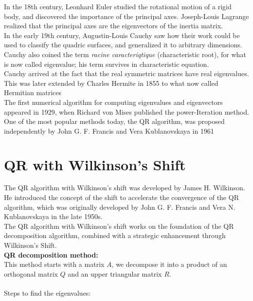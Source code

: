 \documentclass[journal]{IEEEtran}
\begin{document}
In the 18th century, Leonhard Euler studied the rotational motion of a rigid body, and discovered the importance of the principal axes. Joseph-Louis Lagrange realized that the principal axes are the eigenvectors of the inertia matrix. \\

In the early 19th century, Augustin-Louis Cauchy saw how their work could be used to classify the quadric surfaces, and generalized it to arbitrary dimensions. Cauchy also coined the term \textit{racine caracteriqtique} (characteristic root), for what is now called eigenvalue; his term survives in characteristic equation. \\

Cauchy arrived at the fact that the real symmetric matrices have real eigenvalues. This was later extended by Charles Hermite in 1855 to what now called Hermitian matrices \\

The first numerical algorithm for computing eigenvalues and eigenvectors appeared in 1929, when Richard von Mises published the power-Iteration method. One of the most popular methods today, the QR algorithm, was proposed independently by John G. F. Francis and Vera Kublanovskaya in 1961

\section{QR with Wilkinson's Shift}
The QR algorithm with Wilkinson's shift was developed by James H. Wilkinson. He introduced the concept of the shift to accelerate the convergence of the QR algorithm, which was originally developed by John G. F. Francis and Vera N. Kublanovskaya in the late 1950s.\\

The QR algorithm with Wilkinson's shift works on the foundation of the QR decomposition algorithm, combined with a strategic enhancement through Wilkinson's Shift.\\

\textbf{QR decomposition method:}\\
This method starts with a matrix $A$, we decompose it
 into a product of an orthogonal matrix 
$Q$
 and an upper triangular matrix 
$R$.\\\\
Steps to find the eigenvalues:\\
\end{document}
